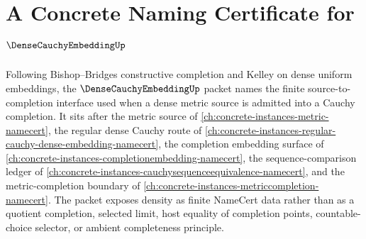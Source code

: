 \chapter{A Concrete Naming Certificate for $\DenseCauchyEmbeddingUp$}
\label{ch:concrete-instances-dense-cauchy-embedding-namecert}

Following Bishop--Bridges constructive completion and Kelley on dense uniform embeddings, the $\DenseCauchyEmbeddingUp$ packet names the finite source-to-completion interface used when a dense metric source is admitted into a Cauchy completion. It sits after the metric source of \autoref{ch:concrete-instances-metric-namecert}, the regular dense Cauchy route of \autoref{ch:concrete-instances-regular-cauchy-dense-embedding-namecert}, the completion embedding surface of \autoref{ch:concrete-instances-completionembedding-namecert}, the sequence-comparison ledger of \autoref{ch:concrete-instances-cauchysequenceequivalence-namecert}, and the metric-completion boundary of \autoref{ch:concrete-instances-metriccompletion-namecert}. The packet exposes density as finite NameCert data rather than as a quotient completion, selected limit, host equality of completion points, countable-choice selector, or ambient completeness principle.

